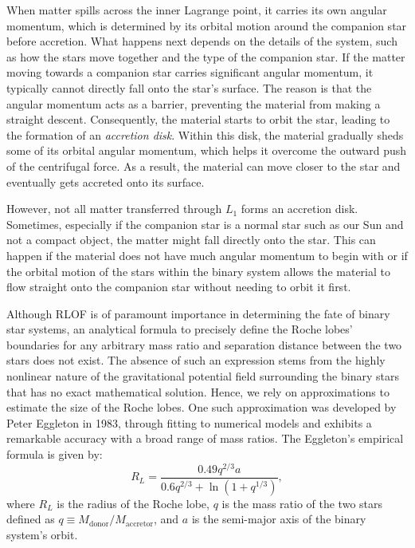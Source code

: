 \documentclass[main.tex]{subfiles}
\begin{document}
    When matter spills across the inner Lagrange point, it carries its own angular momentum, which is determined by its orbital motion around the companion star before accretion. What happens next depends on the details of the system, such as how the stars move together and the type of the companion star. 
    If the matter moving towards a companion star carries significant angular momentum, it typically cannot directly fall onto the star's surface. The reason is that the angular momentum acts as a barrier, preventing the material from making a straight descent. Consequently, the material starts to orbit the star, leading to the formation of an \textit{accretion disk}. Within this disk, the material gradually sheds some of its orbital angular momentum, which helps it overcome the outward push of the centrifugal force. As a result, the material can move closer to the star and eventually gets accreted onto its surface.
    
    However, not all matter transferred through $L_1$ forms an accretion disk. Sometimes, especially if the companion star is a normal star such as our Sun and not a compact object, the matter might fall directly onto the star. This can happen if the material does not have much angular momentum to begin with or if the orbital motion of the stars within the binary system allows the material to flow straight onto the companion star without needing to orbit it first.

    Although RLOF is of paramount importance in determining the fate of binary star systems, an analytical formula to precisely define the Roche lobes' boundaries for any arbitrary mass ratio and separation distance between the two stars does not exist. The absence of such an expression stems from the highly nonlinear nature of the gravitational potential field surrounding the binary stars that has no exact mathematical solution. Hence, we rely on approximations to estimate the size of the Roche lobes. One such approximation was developed by Peter Eggleton in 1983, through fitting to numerical models and exhibits a remarkable accuracy with a broad range of mass ratios. The Eggleton's empirical formula is given by:
    \begin{equation}\label{eq:eggleton_formula}
       R_L = \frac{0.49 q^{2/3} a}{0.6 q^{2/3} + \ln(1 + q^{1/3})},
    \end{equation}
    where $R_L$ is the radius of the Roche lobe, $q$ is the mass ratio of the two stars defined as $q\equiv M_\mathrm{donor}/M_\mathrm{accretor}$, and $a$ is the semi-major axis of the binary system's orbit.
\end{document}
